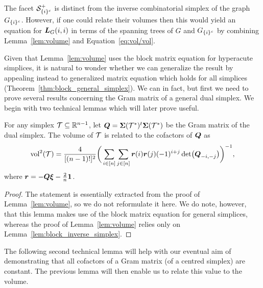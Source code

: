 \begin{remark}
	The facet  $\mathcal{S}_{\{i\}^c}^+$ is distinct from the inverse combinatorial  simplex of the graph  $G_{\{i\}^c}$. However, if one could relate  their volumes then this would yield an equation for  $\vb*{L}_G(i,i)$ in terms of the spanning trees of $G$ and  $G_{\{i\}^c}$ by combining Lemma~\ref{lem:volume}  and Equation~\eqref{eq:vol/vol}.  
\end{remark}

Given that Lemma~\ref{lem:volume} uses the block matrix equation  for hyperacute simplices, it  is natural  to wonder whether we  can generalize the result by appealing instead to generalized matrix equation which holds for all simplices  (Theorem~\ref{thm:block_general_simplex}). We can in fact, but first  we need to prove several results concerning the Gram matrix of a  general  dual  simplex.  We begin  with two  technical lemmas which  will later prove useful. 

\begin{lemma}
	\label{lem:volume_cofactors}
	For any simplex $\mathcal{T}\subseteq\mathbb{R}^{n-1}$, let $\vb*{Q}=\boldsymbol{\Sigma}(\mathcal{T}^*)^t\boldsymbol{\Sigma}(\mathcal{T}^*)$ be the Gram matrix of the dual simplex. The volume of $\mathcal{T}$ is related  to  the cofactors of $\vb*{Q}$ as 
	\begin{equation*}
	\textnormal{vol}^2(\mathcal{T}) = \frac{4}{[(n-1)!]^2} \bigg(\sum_{i\in[n]}\sum_{j\in[n]} \vb*{r}(i)\vb*{r}(j)(-1)^{i+j}\det(\vb*{Q}_{-i,-j})\bigg)^{-1},
	\end{equation*}
	where $\vb*{r}=-\vb*{Q}\vb*{\xi}-\frac{2}{n}\vb{1}$. 
\end{lemma}
\begin{proof}
	The statement  is essentially  extracted from the proof of Lemma~\ref{lem:volume}, so we do not reformulate it here. We do  note, however, that this lemma makes use of the block matrix equation for general simplices, whereas the proof of Lemma~\ref{lem:volume}  relies  only on Lemma~\ref{lem:block_inverse_simplex}. 
\end{proof}

The following second technical lemma will help with our eventual aim of demonstrating  that all cofactors of a Gram matrix (of a centred simplex) are constant. The  previous lemma will then  enable us  to relate this value to the volume. 

